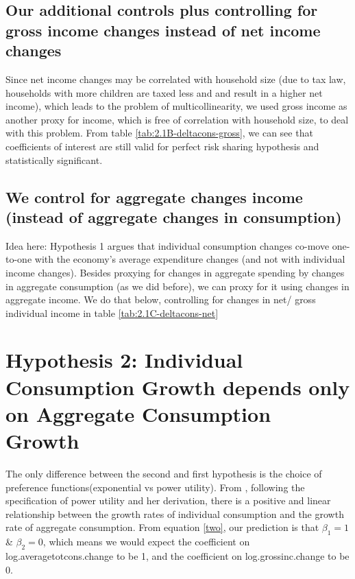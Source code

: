 \documentclass[12pt,a4paper]{article}
\begin{document}
\subsection{Our additional controls plus controlling for gross income changes instead of net income changes} 
Since net income changes may be correlated with household size (due to tax law, households with more children are taxed less and and result in a higher net income), which leads to the problem of multicollinearity, we used gross income as another proxy for income, which is free of correlation with household size, to deal with this problem. From table \ref{tab:2.1B-deltacons-gross}, we can see that coefficients of interest are still valid for perfect risk sharing hypothesis and statistically significant. 


\subsection{We control for aggregate changes income (instead of aggregate changes in consumption)} 

Idea here: Hypothesis 1 argues that individual consumption changes co-move one-to-one with the economy's average expenditure changes (and not with individual income changes). Besides proxying for changes in aggregate spending by changes in aggregate consumption (as we did before), we can proxy for it using changes in aggregate income. We do that below, controlling for changes in net/ gross individual income in table \ref{tab:2.1C-deltacons-net}




\section{Hypothesis 2: Individual Consumption Growth depends only on Aggregate Consumption Growth}
The only difference between the second and first hypothesis is the choice of preference functions(exponential vs power utility). From \citealp{mace1991}, following the specification of power utility and her derivation, there is a positive and linear relationship between the growth rates of individual consumption and the growth rate of aggregate consumption. From equation \eqref{two}, our prediction is that $\beta_1=1$ \& $\beta_2=0$, which means we would expect the coefficient on log.averagetotcons.change to be 1, and the coefficient on log.grossinc.change to be 0. 
\end{document}
